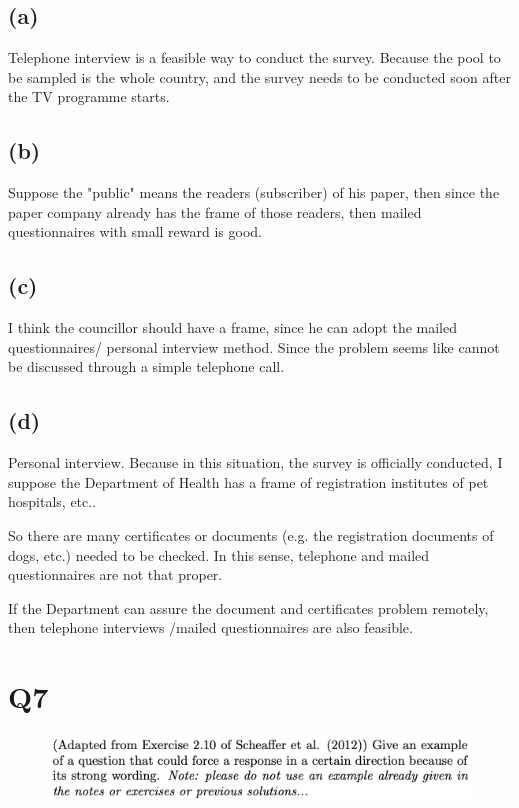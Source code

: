 \documentclass[12pt]{article}%
\begin{document}
\subsection{(a)}
Telephone interview is a feasible way to conduct the survey. Because the pool to be sampled 
is the whole country, and the survey needs to be conducted soon after the TV programme starts.

\subsection{(b)}
Suppose the "public" means the readers (subscriber) of his paper, 
then since the paper company already has the frame of those readers, then mailed questionnaires
with small reward is good.

\subsection{(c)}
I think the councillor should have a frame, since he can adopt the mailed questionnaires/
personal interview method. Since the problem seems like cannot be discussed through a simple
telephone call.


\subsection{(d)}
Personal interview. Because in this situation, the survey is officially conducted, 
I suppose the Department of Health has a frame of registration institutes of pet hospitals, etc..

So there are many certificates or documents (e.g. the registration documents of dogs, etc.)
needed to be checked. In this sense, telephone and mailed questionnaires are not that proper.

If the Department can assure the document and certificates problem remotely, then telephone
interviews /mailed questionnaires are also feasible.


\newpage
\section{Q7}
\begin{figure}[htp]
    \includegraphics[width = 14cm]{img/Q7.png}
\end{figure}
\end{document}

